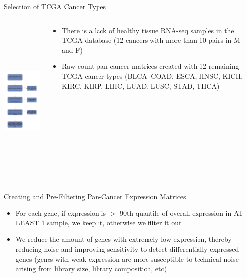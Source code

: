 \documentclass{beamer}
\begin{document}
	\begin{frame}{Selection of TCGA Cancer Types}
			\begin{columns}
				\begin{column}{0.45\textwidth}
					\includegraphics[width=5cm, height=8cm]{img3.png}
				\end{column}
				\begin{column}{0.5\textwidth}
					\begin{itemize}
						\item There is a lack of healthy tissue RNA-seq samples in the TCGA database (12 cancers with more than 10 pairs in M and F)
						\item Raw count pan-cancer matrices created with 12 remaining TCGA cancer types (BLCA, COAD, ESCA, HNSC, KICH, KIRC, KIRP, LIHC, LUAD, LUSC, STAD, THCA)
					\end{itemize}
				\end{column}
			\end{columns}			
	\end{frame}

	\begin{frame}{Creating and Pre-Filtering Pan-Cancer Expression Matrices}
		\begin{itemize}
			\item For each gene, if expression is $>$ 90th quantile of overall expression in AT LEAST 1 sample, we keep it, otherwise we filter it out
			\item We reduce the amount of genes with extremely low expression, thereby reducing noise and improving sensitivity to detect differentially expressed genes (genes with weak expression are more susceptible to technical noise arising from library size, library composition, etc)
		\end{itemize}
	\end{frame}
\end{document}
